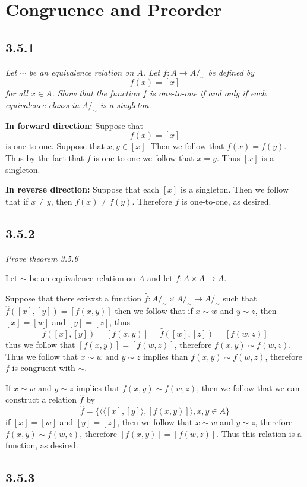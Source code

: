 \documentclass[11pt,oneside,titlepage]{book}
\newcommand{\eangle}[1]{\langle #1 \rangle}
\begin{document}
\section{Congruence and Preorder}

\subsection*{3.5.1}

\textit{Let $\sim$ be an equivalence relation on $A$. Let $f: A \to A/_\sim$ be defined by
  $$f(x) = [x]$$
  for all $x \in A$. Show that the function $f$ is one-to-one if and only if each equivalence
  classs in $A/_\sim$ is a singleton.}

\textbf{In forward direction: }
Suppose that
$$f(x) = [x]$$
is one-to-one. Suppose that $x, y \in [x]$. Then we follow that $f(x) = f(y)$. Thus by the fact
that $f$ is one-to-one we follow that $x = y$. Thus $[x]$ is a singleton.

\textbf{In reverse direction: }
Suppose that each $[x]$ is a singleton. Then we follow that if $x \neq y$, then $f(x) \neq f(y)$.
Therefore $f$ is one-to-one, as desired.

\subsection*{3.5.2}

\textit{Prove theorem 3.5.6}

Let $\sim$ be an equivalence relation on $A$ and let $f: A \times A \to A$.

Suppose that there exisxst a function $\hat{f}: A/_\sim \times A/_\sim \to A/_\sim$ such that
$\hat{f}([x], [y]) = [f(x, y)]$
then we follow that if $x \sim w$ and $y \sim z$, then $[x] = [w]$ and $[y] = [z]$, thus
$$\hat{f}([x], [y]) = [f(x, y)] = \hat{f}([w], [z]) = [f(w, z)]$$
thus we follow that $[f(x, y)] = [f(w, z)]$, therefore $f(x, y) \sim f(w, z)$.
Thus we follow that $x \sim w$ and $y \sim z$ implies than $f(x, y) \sim f(w, z)$, therefore
$f$ is congruent with $\sim$.

If $x \sim w$ and $y \sim z$ implies that $f(x, y) \sim f(w, z)$, then we follow that
we can construct a relation
$\hat{f}$  by
$$\hat{f} = \{ \eangle{\eangle{[x], [y]}, [f(x, y)]}, x, y \in A\}$$
if $[x] = [w]$ and $[y] = [z]$, then we follow that $x \sim w$ and $y \sim z$, therefore
$f(x, y) \sim f(w, z)$, therefore  $[f(x, y)] = [f(w, z)]$. Thus this relation is a function, as
desired.

\subsection*{3.5.3}
\end{document}
